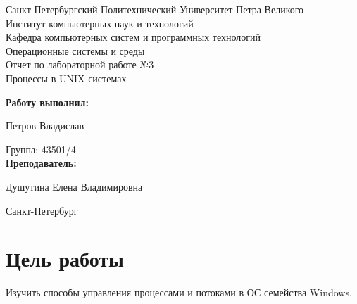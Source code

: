 \documentclass[a4paper]{article}
\begin{document}
\begin{titlepage} %

\begin{center} %

\large Санкт-Петербургский Политехнический Университет Петра Великого\\
\large Институт компьютерных наук и технологий \\
\large Кафедра компьютерных систем и программных технологий\\[6cm]

\huge Операционные системы и среды\\[0.5cm]
\large Отчет по лабораторной работе №3\\[0.1cm]
\large Процессы в UNIX-системах\\[5cm]
\end{center}

\begin{flushright}
\begin{minipage}{0.5\textwidth}
\begin{flushright}
\textbf{Работу выполнил:}

Петров Владислав

{Группа:} 43501/4\\


\textbf{Преподаватель:} 

Душутина Елена Владимировна
\end{flushright}
\end{minipage} %
\end{flushright} %

\vfill %

\begin{center}

\large Санкт-Петербург\\
\large \the\year %

\end{center} %

\thispagestyle{empty} %
\end{titlepage} %

\vfill %


\section{Цель работы}
	Изучить способы управления процессами и потоками в ОС семейства Windows.
	
\end{document}

